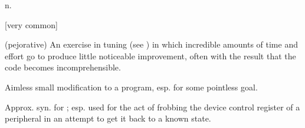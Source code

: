  n.

[very common]
\begin{inparaenum}
    \item (pejorative) An exercise in tuning (see ) in which
        incredible amounts of time and effort go to produce little noticeable
        improvement, often with the result that the code becomes
        incomprehensible.
    \item Aimless small modification to a program, esp. for some pointless goal.
    \item Approx. syn. for ; esp. used for the act of
        frobbing the device control register of a peripheral in an attempt to
        get it back to a known state.
\end{inparaenum}

